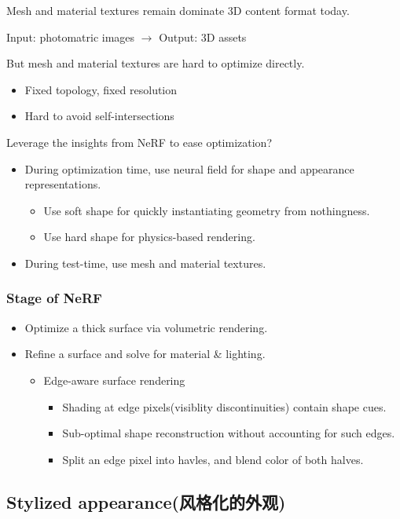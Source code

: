 \documentclass[cn,hazy,blue,14pt,screen]{elegantnote}
\begin{document}
Mesh and material textures remain dominate 3D content format today.

Input: photomatric images $\rightarrow$ Output: 3D assets

But mesh and material textures are hard to optimize directly.
\begin{itemize}
\item Fixed topology, fixed resolution
\item Hard to avoid self-intersections
\end{itemize}

Leverage the insights from NeRF to ease optimization?
\begin{itemize}
\item During optimization time, use neural field for shape and appearance representations.
\begin{itemize}
\item Use soft shape for quickly instantiating geometry from nothingness.
\item Use hard shape for physics-based rendering.
\end{itemize}
\item During test-time, use mesh and material textures.
\end{itemize}

\subsubsection{Stage of NeRF}

\begin{itemize}
\item Optimize a thick surface via volumetric rendering.
\item Refine a surface and solve for material \& lighting.
\begin{itemize}
\item Edge-aware surface rendering
\begin{itemize}
\item Shading at edge pixels(visiblity discontinuities) contain shape cues.
\item Sub-optimal shape reconstruction without accounting for such edges.
\item Split an edge pixel into havles, and blend color of both halves.
\end{itemize}
\end{itemize}
\end{itemize}

\subsection{Stylized appearance(风格化的外观)}
\end{document}
